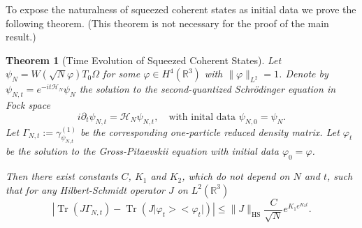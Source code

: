 \documentclass[11pt,a4paper,draft,DIV11]{scrartcl}	%
\newtheorem{thm}{Theorem}[section]
\newcommand{\Hcal}{\mathcal{H}}		%
\newcommand{\Rbb}{\mathbb{R}}		%
\newcommand{\norm}[1]{\lVert#1\rVert}	%
\newcommand{\project}[1]{\lvert #1 \big>\big< #1\rvert}	%
\newcommand{\Tr}{\operatorname{Tr}}	%
\newcommand{\HS}{_{\textrm{HS}}}
\newcommand{\bd}{\begin{displaymath}}			%
\newcommand{\ed}{\end{displaymath}}
\begin{document}
To expose the naturalness of squeezed coherent states as initial data we prove the following theorem. (This theorem is not necessary for the proof of the main result.)
\begin{thm}[Time Evolution of Squeezed Coherent States] \label{thm:main_squeezed}
 Let $\psi_{N} = W(\sqrt{N} \varphi) T_0 \Omega$ for some $\varphi \in H^4(\Rbb^3)$ with $\norm{\varphi}_{L^2} = 1$. Denote by $\psi_{N,t} = e^{-it \Hcal_N}\psi_N$ the solution to the second-quantized Schr\"odinger equation in Fock space
\[i \partial_t \psi_{N,t} = \Hcal_N \psi_{N,t},\quad \mbox{with inital data } \psi_{N,0} = \psi_N.\]
Let $\Gamma_{N,t} := \gamma_{\psi_{N,t}}^{(1)}$ be the corresponding one-particle reduced density matrix.
Let $\varphi_t$ be the solution to the Gross-Pitaevskii equation with initial data $\varphi_0 = \varphi$.

 Then there exist constants $C$, $K_1$ and $K_2$, which do not depend on $N$ and $t$, such that for any Hilbert-Schmidt operator $J$ on $L^2(\Rbb^3)$
\bd
\left\lvert \Tr\left(J \Gamma_{N,t} \right) - \Tr\left( J \project{\varphi_t}  \right) \right\rvert \leq \norm{J}\HS \frac{C}{\sqrt{N}}e^{K_1 e^{K_2 t}}.
\ed
\end{thm}
\end{document}
